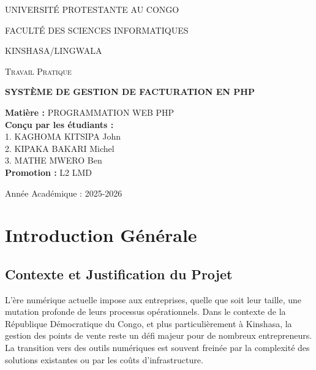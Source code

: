 \documentclass[12pt,a4paper]{report}
\begin{document}
\begin{titlepage}
    \centering
    \vspace*{0.5cm}
    {\scshape\Large UNIVERSITÉ PROTESTANTE AU CONGO \par}
    {\scshape\large FACULTÉ DES SCIENCES INFORMATIQUES \par}
    {\scshape\large KINSHASA/LINGWALA \par}
    \vspace{2cm}
    \vspace{1cm}
    {\scshape\Large Travail Pratique \par}
    \vspace{1cm}
    {\huge\bfseries SYSTÈME DE GESTION DE FACTURATION EN PHP \par}
    \vspace{2cm}

    \begin{flushleft}
    {\Large\bfseries Matière :} PROGRAMMATION WEB PHP \\
    \vspace{0.8cm}
    {\Large\bfseries Conçu par les étudiants :} \\
    {\large 1. KAGHOMA KITSIPA John} \\
    {\large 2. KIPAKA BAKARI Michel} \\
    {\large 3. MATHE MWERO Ben} \\
    \vspace{0.8cm}
    {\Large\bfseries Promotion :} L2 LMD \\
    \end{flushleft}

    \vfill
    {\large Année Académique : 2025-2026 \par}
\end{titlepage}

\tableofcontents
\newpage

\chapter{Introduction Générale}
\section{Contexte et Justification du Projet}
L'ère numérique actuelle impose aux entreprises, quelle que soit leur taille, une mutation profonde de leurs processus opérationnels. Dans le contexte de la République Démocratique du Congo, et plus particulièrement à Kinshasa, la gestion des points de vente reste un défi majeur pour de nombreux entrepreneurs. La transition vers des outils numériques est souvent freinée par la complexité des solutions existantes ou par les coûts d'infrastructure.
\end{document}
